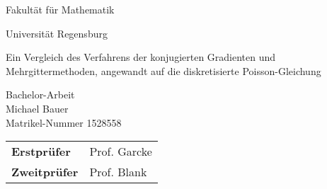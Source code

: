 
\pagestyle{empty}

\clearscrheadings\clearscrplain

\begin{center}
\begin{Huge}
Fakultät für Mathematik\\
\vspace{3mm}
\end{Huge}{\Large Universität Regensburg}\\

\vspace{20mm}
\begin{Large}
Ein Vergleich des Verfahrens der konjugierten Gradienten und Mehrgittermethoden, angewandt auf die diskretisierte Poisson-Gleichung\\
\end{Large}
\vspace{8mm}
Bachelor-Arbeit\\
\vspace{0.4cm}
\vspace{2 cm}
Michael Bauer \\
Matrikel-Nummer 1528558\\
\vspace{8cm}
\begin{tabular}{ll}
{\bf Erstprüfer}&Prof. Garcke\\
{\bf Zweitprüfer}&Prof. Blank\\
\end{tabular}

\end{center}
\clearpage


\pagestyle{useheadings} %

\tableofcontents






